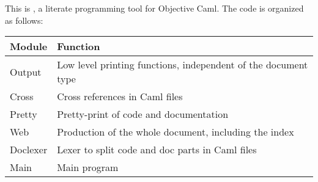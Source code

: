 
\newcommand{\ocaml}{\textsf{Objective Caml}}

\ocwsection
This is \ocamlweb, a literate programming tool for \ocaml.
The code is organized as follows:

\begin{center}
\begin{tabular}{|l|l|}
  \hline
  \bf Module  &  \bf Function \\
  \hline\hline
  Output  &  Low level printing functions, independent of the document
  type \\
  \hline
  Cross   & Cross references in Caml files \\
  \hline
  Pretty  & Pretty-print of code and documentation \\
  \hline
  Web     & Production of the whole document, including the index \\
  \hline
  Doclexer& Lexer to split code and doc parts in Caml files \\
  \hline
  Main    & Main program \\
  \hline
\end{tabular}
\end{center}
